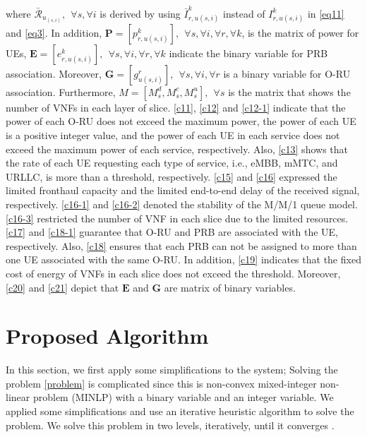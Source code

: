 \documentclass[conference]{IEEEtran}
\begin{document}
\noindent where $\bar{\mathcal{R}}_{u_{(s,i)}}, \:\:\forall s , \forall i$ is derived by using $\bar{I}_{r,u(s,i)}^{k}$ instead of $I_{r,u(s,i)}^{k}$ in  \eqref{eq11} and \eqref{eq3}.
In addition, $\boldsymbol{P} =[p_{r,u(s,i)}^{k}], \:\: \forall s , \forall i, \forall r, \forall k $, is the matrix of power for UEs, $\boldsymbol{E} =[e_{r,u(s,i)}^k], \:\: \forall s , \forall i, \forall r, \forall k$ indicate the binary variable for PRB association. Moreover, $\boldsymbol{G} =[g_{u(s,i)}^r], \:\: \forall s , \forall i, \forall r$ is a binary variable for O-RU association. Furthermore, $M = [M_s^d, M_s^c, M_s^u], \:\: \forall s$ is the matrix that shows the number of VNFs in each layer of slice.
\eqref{c11}, \eqref{c12} and \eqref{c12-1} indicate that the power of each O-RU does not exceed the maximum power, the power of each UE is a positive integer value, and the power of each UE in each service does not exceed the maximum power of each service, respectively.  
Also, \eqref{c13} shows that the rate of each UE requesting each type of service, i.e., eMBB, mMTC, and URLLC, is more than a threshold, respectively.
\eqref{c15} and \eqref{c16} expressed the limited fronthaul capacity and the limited end-to-end delay of the received signal, respectively.
\eqref{c16-1} and \eqref{c16-2} denoted the stability of the M/M/1 queue model.
\eqref{c16-3} restricted the number of VNF in each slice due to the limited resources.
\eqref{c17} and \eqref{c18-1} guarantee that O-RU and PRB are associated with the UE, respectively.
Also, \eqref{c18} ensures that each PRB can not be assigned to more than one UE associated with the same O-RU.
In addition, \eqref{c19} indicates that the fixed cost of energy of VNFs in each slice does not exceed the threshold. 
Moreover, \eqref{c20} and \eqref{c21} depict that $\boldsymbol{E}$ and $\boldsymbol{G}$ are matrix of binary variables.
\section{Proposed Algorithm}\label{proAlg}
In this section, we first apply some simplifications to the system; Solving the problem \eqref{problem} is complicated since this is non-convex mixed-integer non-linear problem (MINLP) with a binary variable and an integer variable. 
We applied some simplifications and use an iterative heuristic algorithm to solve the problem.
We solve this problem in two levels, iteratively, until it converges \cite{ali2018joint}.
\end{document}
